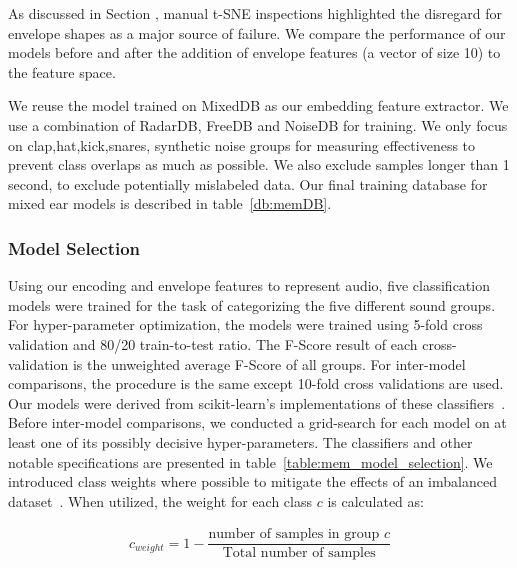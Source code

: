 \documentclass[\main/thesis.tex]{subfiles}
\begin{document}
As discussed in Section \label{fig:embedding_FE}, manual t-SNE inspections highlighted the disregard for envelope shapes as a major source of failure. We compare the performance of our models before and after the addition of envelope features (a vector of size 10) to the feature space. 

We reuse the model trained on  MixedDB as our embedding feature extractor. We use a combination of RadarDB, FreeDB and NoiseDB for training. We only focus on clap,hat,kick,snares, synthetic noise groups for measuring effectiveness to prevent class overlaps as much as possible. We also exclude samples longer than 1 second, to exclude potentially mislabeled data. Our final training database for mixed ear models is described in table~\ref{db:memDB}.

\subsubsection{Model Selection}
Using our encoding and envelope features to represent audio, five classification models were trained for the task of categorizing the five different sound groups. For hyper-parameter optimization, the models were trained using 5-fold cross validation and 80/20 train-to-test ratio. The F-Score result of each cross-validation is the unweighted average F-Score of all groups. For inter-model comparisons, the procedure is the same except 10-fold cross validations are used. Our models were derived from scikit-learn's implementations of these classifiers~\cite{pedregosa2011scikit}. Before inter-model comparisons, we conducted a grid-search for each model on at least one of its possibly decisive hyper-parameters. The classifiers and other notable specifications are presented in table~\ref{table:mem_model_selection}. We introduced class weights where possible to mitigate the effects of an imbalanced dataset~\cite{provost2000machine,chawla2004special}. When utilized, the weight for each class $c$  is calculated as:

\begin{subequations}
    \begin{align*}
    c_{weight} = 1-\dfrac{\text{number of samples in group $c$} }{\text{Total number of samples}}
    \end{align*}
\end{subequations}
\end{document}
